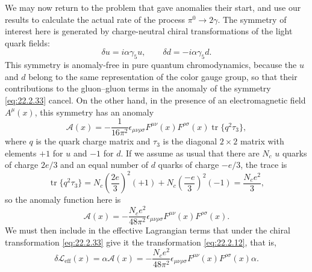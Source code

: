 We may now return to the problem that gave anomalies their start, and use
our results to calculate the actual rate of the process $\pi^0\to2\gamma$.
The symmetry of interest here is generated by charge-neutral chiral
transformations of the light quark fields:
\begin{equation}
 \delta u=i\alpha\gamma_5u,\qquad
 \delta d=-i\alpha\gamma_5d.
 \tag{22.2.33}\label{eq:22.2.33}
\end{equation}
This symmetry is anomaly-free in pure quantum chromodynamics, because the
$u$ and $d$ belong to the same representation of the color gauge group, so
that their contributions to the gluon--gluon terms in the anomaly of the
symmetry \eqref{eq:22.2.33} cancel. On the other hand, in the presence of
an electromagnetic field $A^\mu(x)$, this symmetry has an anomaly
\[
 \mathcal A(x)=-\frac{1}{16\pi^2}\epsilon_{\mu\nu\rho\sigma}
 F^{\mu\nu}(x)F^{\rho\sigma}(x)
 \operatorname{tr}\{q^2\tau_3\},
\]
where $q$ is the quark charge matrix and $\tau_3$ is the diagonal
$2\times2$ matrix with elements $+1$ for $u$ and $-1$ for $d$. If we
assume as usual that there are $N_c$ $u$ quarks of charge $2e/3$ and an
equal number of $d$ quarks of charge $-e/3$, the trace is
\[
 \operatorname{tr}\{q^2\tau_3\}
 =N_c\left(\frac{2e}{3}\right)^2(+1)
 +N_c\left(\frac{-e}{3}\right)^2(-1)
 =\frac{N_ce^2}{3},
\]
so the anomaly function here is
\begin{equation}
 \mathcal A(x)=-\frac{N_ce^2}{48\pi^2}
 \epsilon_{\mu\nu\rho\sigma}F^{\mu\nu}(x)F^{\rho\sigma}(x).
 \tag{22.2.34}\label{eq:22.2.34}
\end{equation}
We must then include in the effective Lagrangian terms that under the
chiral transformation \eqref{eq:22.2.33} give it the transformation
\eqref{eq:22.2.12}, that is,
\begin{equation}
 \delta\mathcal L_{\mathrm{eff}}(x)=\alpha\mathcal A(x)
 =-\frac{N_ce^2}{48\pi^2}\epsilon_{\mu\nu\rho\sigma}
 F^{\mu\nu}(x)F^{\rho\sigma}(x)\alpha.
 \tag{22.2.35}\label{eq:22.2.35}
\end{equation}

